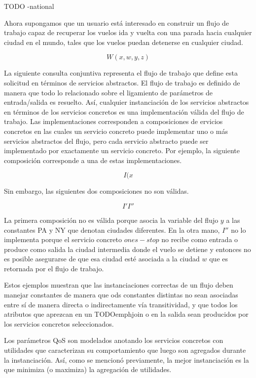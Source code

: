 \documentclass{article}
\begin{document}
\begin{itemize}
TODO
-national
\end{itemize}

Ahora supongamos que un usuario está interesado en construir un flujo de trabajo
capaz de recuperar los vuelos ida y vuelta con una parada hacia cualquier ciudad
en el mundo, tales que los vuelos puedan detenerse en cualquier ciudad.

$$
W(x,w,y,z)
$$

La siguiente consulta conjuntiva representa el flujo de trabajo que define esta
solicitud en términos de servicios abstractos. El flujo de trabajo es definido
de manera que todo lo relacionado sobre el ligamiento de parámetros de
entrada/salida es resuelto. Así, cualquier instanciación de los servicios
abstractos en términos de los servicios concretos es una implementación válida
del flujo de trabajo. Las implementaciones corresponden a composiciones de
ervicios concretos en las cuales un servicio concreto puede implementar uno o
más servicios abstractos del flujo, pero cada servicio abstracto puede ser
implementado por exactamente un servicio concreto. Por ejemplo, la siguiente
composición corresponde a una de estas implementaciones.

$$
I(x
$$

Sin embargo, las siguientes dos composiciones no son válidas.

$$
I'
I''
$$

La primera composición no es válida porque asocia la variable del flujo $y$ a
las constantes PA y NY que denotan ciudades diferentes. En la otra mano, $I''$
no lo implementa porque el servicio concreto $ones-stop$ no recibe como entrada
o produce como salida la ciudad intermedia donde el vuelo se detiene y entonces
no es posible asegurarse de que esa ciudad esté asociada a la ciudad $w$ que es
retornada por el flujo de trabajo.

Estos ejemplos muestran que las instanciaciones correctas de un flujo deben
manejar constantes de manera que ods constantes distintas no sean asociadas
entre sí de manera directa o indirectamente vía transitividad, y que todos los
atributos que aprezcan en un TODOemphjoin o en la salida sean producidos por los
servicios concretos seleccionados.

Los parámetros QoS son modelados anotando los servicios concretos con utilidades
que caracterizan su comportamiento que luego son agregados durante la
instanciación. Así, como se mencionó previamente, la mejor instanciación es la
que minimiza (o maximiza) la agregación de utilidades.
\end{document}
